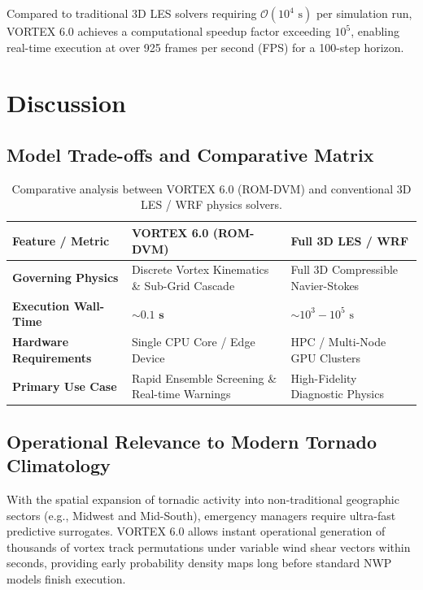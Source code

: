 \documentclass[11pt, a4paper]{article}
\begin{document}
Compared to traditional 3D LES solvers requiring $\mathcal{O}(10^4\text{ s})$ per simulation run, VORTEX 6.0 achieves a computational speedup factor exceeding $10^5$, enabling real-time execution at over 925 frames per second (FPS) for a 100-step horizon.

\section{Discussion}

\subsection{Model Trade-offs and Comparative Matrix}

\begin{table}[htbp]
\centering
\caption{Comparative analysis between VORTEX 6.0 (ROM-DVM) and conventional 3D LES / WRF physics solvers.}
\label{tab:comparative_matrix}
\vspace{0.2cm}
\begin{tabular}{p{3.8cm}p{5.5cm}p{5.5cm}}
\toprule
\textbf{Feature / Metric} & \textbf{VORTEX 6.0 (ROM-DVM)} & \textbf{Full 3D LES / WRF} \\
\midrule
\textbf{Governing Physics} & Discrete Vortex Kinematics \& Sub-Grid Cascade & Full 3D Compressible Navier-Stokes \\
\textbf{Execution Wall-Time} & $\mathbf{\sim 0.1\text{ s}}$ & $\sim 10^3 - 10^5\text{ s}$ \\
\textbf{Hardware Requirements} & Single CPU Core / Edge Device & HPC / Multi-Node GPU Clusters \\
\textbf{Primary Use Case} & Rapid Ensemble Screening \& Real-time Warnings & High-Fidelity Diagnostic Physics \\
\bottomrule
\end{tabular}
\end{table}

\subsection{Operational Relevance to Modern Tornado Climatology}

With the spatial expansion of tornadic activity into non-traditional geographic sectors (e.g., Midwest and Mid-South), emergency managers require ultra-fast predictive surrogates. VORTEX 6.0 allows instant operational generation of thousands of vortex track permutations under variable wind shear vectors within seconds, providing early probability density maps long before standard NWP models finish execution.
\end{document}
